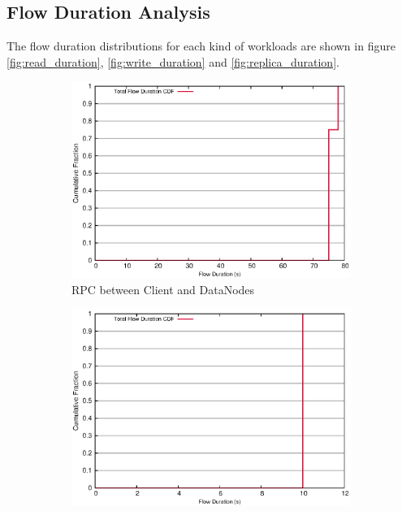 \subsection{\bf Flow Duration Analysis}
The flow duration distributions for each kind of workloads are shown in figure \ref{fig:read_duration}, \ref{fig:write_duration} and \ref{fig:replica_duration}.

\begin{figure}[!htpb]
\label{fig:read_duration}
\centering
  \begin{subfigure}[b]{.45\linewidth}
   \centering
	\includegraphics[width=.99\textwidth]{figures/4read/24_28_flow_duration.eps} 
	\caption{RPC between Client and DataNodes}\label{fig:read_duration:rpc}
   \end{subfigure}%
  \begin{subfigure}[b]{.45\linewidth}
   \centering
	\includegraphics[width=.99\textwidth]{figures/4read/8_12_flow_duration.eps} 

\end{subfigure}
\end{figure}
